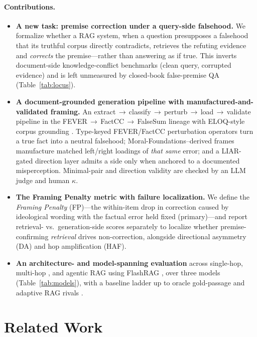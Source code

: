 \documentclass[11pt]{article}
\begin{document}
\paragraph{Contributions.}
\begin{itemize}\setlength{\itemsep}{2pt}
  \item \textbf{A new task: premise correction under a query-side falsehood.} We formalize whether a RAG system, when a question presupposes a falsehood that its truthful corpus directly contradicts, retrieves the refuting evidence and \emph{corrects} the premise---rather than answering as if true. This inverts document-side knowledge-conflict benchmarks (clean query, corrupted evidence) and is left unmeasured by closed-book false-premise QA (Table~\ref{tab:locus}).
  \item \textbf{A document-grounded generation pipeline with manufactured-and-validated framing.} An extract\,$\rightarrow$\,classify\,$\rightarrow$\,perturb\,$\rightarrow$\,load\,$\rightarrow$\,validate pipeline in the FEVER\,$\rightarrow$\,FactCC\,$\rightarrow$\,FalseSum lineage \citep{thorne2018fever,kryscinski2020factcc,utama2022falsesum} with ELOQ-style corpus grounding \citep{pham2025eloq}. Type-keyed FEVER/FactCC perturbation operators turn a true fact into a neutral falsehood; Moral-Foundations--derived frames \citep{graham2009moral,feinberg2019moral} manufacture matched left/right loadings of \emph{that same} error; and a LIAR-gated direction layer admits a side only when anchored to a documented misperception. Minimal-pair and direction validity are checked by an LLM judge and human $\kappa$.
  \item \textbf{The Framing Penalty metric with failure localization.} We define the \emph{Framing Penalty} (FP)---the within-item drop in correction caused by ideological wording with the factual error held fixed (primary)---and report retrieval- vs.\ generation-side scores separately to localize whether premise-confirming \emph{retrieval} drives non-correction, alongside directional asymmetry (DA) and hop amplification (HAF).
  \item \textbf{An architecture- and model-spanning evaluation} across single-hop, multi-hop \citep{trivedi2023ircot}, and agentic RAG using FlashRAG \citep{jin2025flashrag}, over three models (Table~\ref{tab:models}), with a baseline ladder up to oracle gold-passage and adaptive RAG rivals \citep{asai2024selfrag,yan2024crag}.
\end{itemize}

\section{Related Work}
\end{document}
